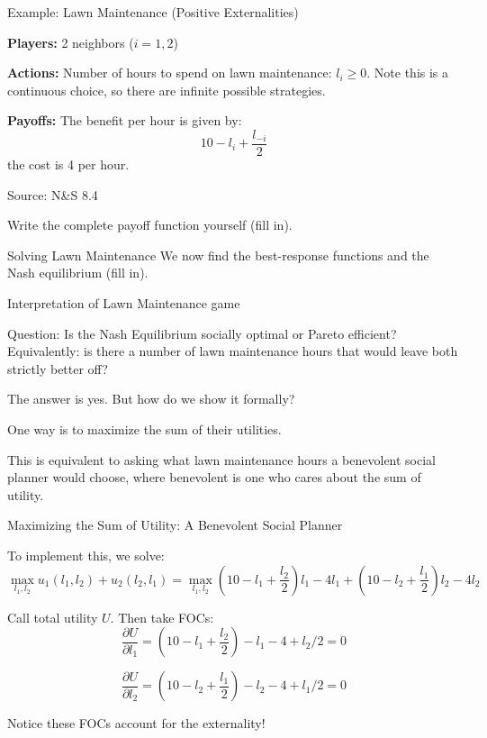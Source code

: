 \documentclass[aspectratio=169]{beamer}
\newenvironment{wideitemize}{\itemize\addtolength{\itemsep}{10pt}}{\enditemize}
\begin{document}
\begin{frame}{Example: Lawn Maintenance (Positive Externalities)}
\begin{wideitemize}
    \item \textbf{Players:} 2 neighbors ($i=1,2$)
    \item \textbf{Actions:} Number of hours to spend on lawn maintenance: $l_i\geq 0$. Note this is a continuous choice, so there are infinite possible strategies.
    \item \textbf{Payoffs:} The benefit per hour is given by:
    \[10-l_i + \frac{l_{-i}}{2}\]
    the cost is 4 per hour.
\end{wideitemize}

\hfill Source: N\&S 8.4

Write the complete payoff function yourself (fill in).

\vspace{2cm}
\end{frame}

\begin{frame}{Solving Lawn Maintenance}
We now find the best-response functions and the Nash equilibrium (fill in).

\vspace{6cm}

\end{frame}
\begin{frame}{Interpretation of Lawn Maintenance game}

\begin{wideitemize}
    \item Question: Is the Nash Equilibrium socially optimal or Pareto efficient? Equivalently: is there a number of lawn maintenance hours that would leave both strictly better off?
    \item The answer is yes. But how do we show it formally?
    \item One way is to maximize the sum of their utilities.
    \item This is equivalent to asking what lawn maintenance hours a benevolent social planner would choose, where benevolent is one who cares about the sum of utility.

\end{wideitemize}
    
\end{frame}

\begin{frame}{Maximizing the Sum of Utility: A Benevolent Social Planner}

To implement this, we solve:
\[\max_{l_1, l_2} u_1(l_1, l_2) + u_2(l_2, l_1) = \max_{l_1, l_2}(10-l_1 + \frac{l_{2}}{2})l_1 - 4l_1 + (10-l_2 + \frac{l_{1}}{2})l_2 - 4l_2 \]

Call total utility $U$. Then take FOCs:
\[\frac{\partial U}{\partial l_1} = (10-l_1 + \frac{l_{2}}{2}) -l_1 -4 +l_2/2 =0 \]

\[\frac{\partial U}{\partial l_2} = (10-l_2 + \frac{l_{1}}{2}) -l_2 -4 +l_1/2 =0 \]

Notice these FOCs account for the externality!
\end{frame}
\end{document}
